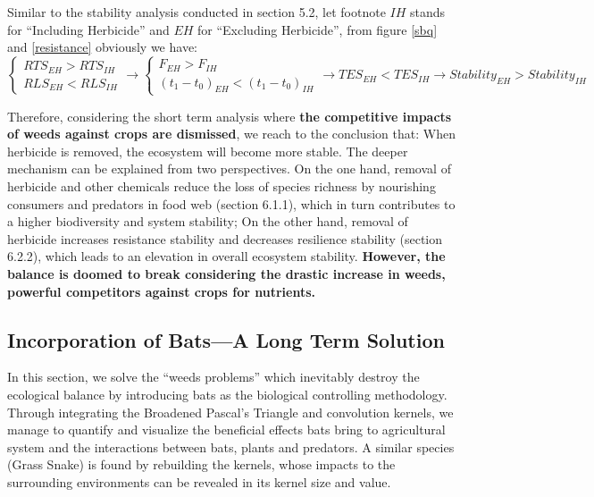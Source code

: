 \documentclass[12pt]{article}
\begin{document}
	Similar to the stability analysis conducted in section 5.2, let footnote $IH$ stands for ``Including Herbicide'' and $EH$ for ``Excluding Herbicide'', from figure \ref{sbq} and \ref{resistance} obviously we have:$$
	\begin{cases}
		RTS_{EH}>RTS_{IH} \\
		RLS_{EH}<RLS_{IH}
	\end{cases}\xrightarrow{ }\begin{cases}
		F_{EH}>F_{IH} \\
		(t_1-t_0)_{EH}<(t_1-t_0)_{IH}
	\end{cases}\xrightarrow{ }TES_{EH}<TES_{IH}
	\xrightarrow{ }Stability_{EH}>Stability_{IH}
	$$
	
	Therefore, considering the short term analysis where \textbf{the competitive impacts of weeds against crops are dismissed}, we reach to the conclusion that: When herbicide is removed, the ecosystem will become more stable. The deeper mechanism can be explained from two perspectives. On the one hand, removal of herbicide and other chemicals reduce the loss of species richness by nourishing consumers and predators in food web (section 6.1.1), which in turn contributes to a higher biodiversity and system stability; On the other hand, removal of herbicide increases resistance stability and decreases resilience stability (section 6.2.2), which leads to an elevation in overall ecosystem stability. \textbf{However, the balance is doomed to break considering the drastic increase in weeds, powerful competitors against crops for nutrients.}
	
	\subsection{Incorporation of Bats---A Long Term Solution}
	\hspace{1.5em}In this section, we solve the ``weeds problems'' which inevitably destroy the ecological balance by introducing bats as the biological controlling methodology. Through integrating the Broadened Pascal's Triangle and convolution kernels, we manage to quantify and visualize the beneficial effects bats bring to agricultural system and the interactions between bats, plants and predators. A similar species (Grass Snake) is found by rebuilding the kernels, whose impacts to the surrounding environments can be revealed in its kernel size and value.
	
\end{document}
